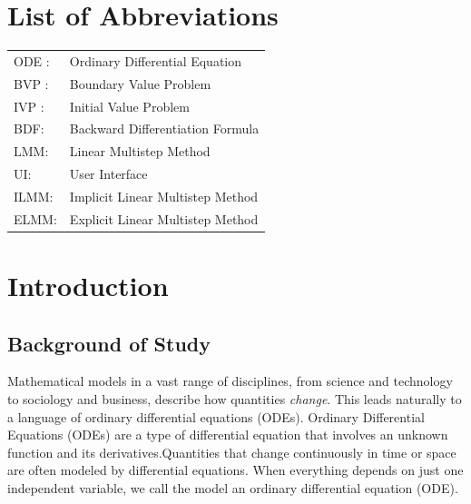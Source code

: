 \documentclass[a4paper, twoside]{report} %
\begin{document}
	\tableofcontents


	\newpage
	\listoffigures

	\listoftables

	\chapter*{List of Abbreviations}
	\begin{tabular}{ll}
		ODE : & Ordinary Differential Equation \\
		BVP : & Boundary Value Problem \\
		IVP : & Initial Value Problem \\
		BDF: &Backward Differentiation Formula \\
		LMM: &Linear Multistep Method \\
		UI: &User Interface \\
		ILMM:& Implicit Linear Multistep Method \\
		ELMM: & Explicit Linear Multistep Method
	\end{tabular}

	\chapter{Introduction}



	\section{Background of Study}
	Mathematical models in a vast range of disciplines, from science and technology to sociology and business, describe how quantities \textsl{change}. This leads naturally to a language of ordinary differential equations (ODEs).
	Ordinary Differential Equations (ODEs) are a type of differential equation that involves an unknown function and its derivatives.Quantities that change continuously in time or space are often modeled by differential equations. When everything depends on just one independent variable, we call the model an ordinary differential equation (ODE)\cite{fnc_multistep_methods}.
\end{document}
